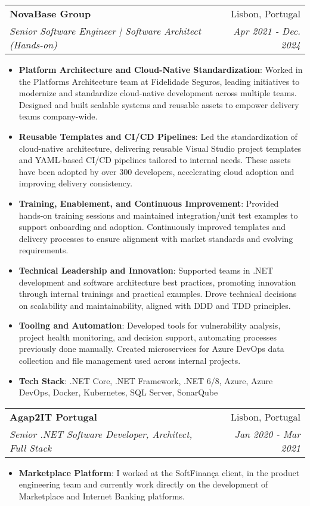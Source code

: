 \documentclass[letterpaper,11pt]{article}
\makeatletter
\newcommand{\resumeItem}[2]{
  \item\small{
    \textbf{#1}{: #2 \vspace{-2pt}}
  }
}
\newcommand{\resumeSubheading}[4]{
  \vspace{-1pt}\item
    \begin{tabular*}{0.97\textwidth}[t]{l@{\extracolsep{\fill}}r}
      \textbf{#1} & #2 \\
      \textit{\small#3} & \textit{\small #4} \\
    \end{tabular*}\vspace{-5pt}
}
\newcommand{\resumeItemListStart}{\begin{itemize}}
\newcommand{\resumeItemListEnd}{\end{itemize}\vspace{-5pt}}
\makeatother
\begin{document}
    \resumeSubheading
    {NovaBase Group}{Lisbon, Portugal}
    {Senior Software Engineer | Software Architect (Hands-on)}{Apr 2021 - Dec. 2024}
    \resumeItemListStart
      \resumeItem{Platform Architecture and Cloud-Native Standardization}
        {Worked in the Platforms Architecture team at Fidelidade Seguros, leading initiatives to modernize and standardize cloud-native development across multiple teams. Designed and built scalable systems and reusable assets to empower delivery teams company-wide.}
      \resumeItem{Reusable Templates and CI/CD Pipelines}
        {Led the standardization of cloud-native architecture, delivering reusable Visual Studio project templates and YAML-based CI/CD pipelines tailored to internal needs. These assets have been adopted by over 300 developers, accelerating cloud adoption and improving delivery consistency.}
      \resumeItem{Training, Enablement, and Continuous Improvement}
        {Provided hands-on training sessions and maintained integration/unit test examples to support onboarding and adoption. Continuously improved templates and delivery processes to ensure alignment with market standards and evolving requirements.}
      \resumeItem{Technical Leadership and Innovation}
        {Supported teams in .NET development and software architecture best practices, promoting innovation through internal trainings and practical examples. Drove technical decisions on scalability and maintainability, aligned with DDD and TDD principles.}
      \resumeItem{Tooling and Automation}
        {Developed tools for vulnerability analysis, project health monitoring, and decision support, automating processes previously done manually. Created microservices for Azure DevOps data collection and file management used across internal projects.}
      \resumeItem{Tech Stack}
        {.NET Core, .NET Framework, .NET 6/8, Azure, Azure DevOps, Docker, Kubernetes, SQL Server, SonarQube}
    \resumeItemListEnd


    \resumeSubheading
    {Agap2IT Portugal}{Lisbon, Portugal}
    {Senior .NET Software Developer, Architect, Full Stack}{Jan 2020 - Mar 2021}
    \resumeItemListStart
      \resumeItem{Marketplace Platform}
        {I worked at the SoftFinança client, in the product engineering team and currently work directly on the development of Marketplace and Internet Banking platforms.}
    \resumeItemListEnd
\end{document}
